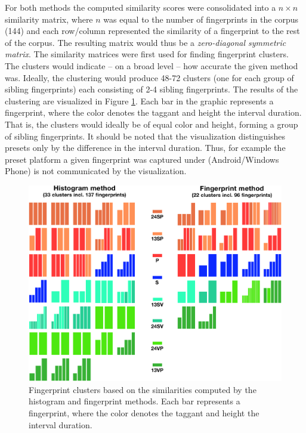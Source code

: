 \documentclass[thesis.tex]{subfiles}
\begin{document}
For both methods the computed similarity scores were consolidated into a $n\times n$ similarity matrix, where $n$ was equal to the number of fingerprints in the corpus (144) and each row/column represented the similarity of a fingerprint to the rest of the corpus. The resulting matrix would thus be a \emph{zero-diagonal symmetric matrix}. The similarity matrices were first used for finding fingerprint clusters. The clusters would indicate -- on a broad level -- how accurate the given method was. Ideally, the clustering would produce 48-72 clusters (one for each group of sibling fingerprints) each consisting of 2-4 sibling fingerprints. The results of the clustering are visualized in Figure \ref{figure:clusters}. Each bar in the graphic represents a fingerprint, where the color denotes the taggant and height the interval duration. That is, the clusters would ideally be of equal color and height, forming a group of sibling fingerprints. It should be noted that the visualization distinguishes presets only by the difference in the interval duration. Thus, for example the preset platform a given fingerprint was captured under (Android/Windows Phone) is not communicated by the visualization.

\begin{figure}[h]
\label{figure:clusters}
\centering \includegraphics[page=1,width=\textwidth,height=\textheight,keepaspectratio=true]{images/experiment/clusters}
\caption{Fingerprint clusters based on the similarities computed by the histogram and fingerprint methods. Each bar represents a fingerprint, where the color denotes the taggant and height the interval duration.}
\end{figure}
\end{document}
